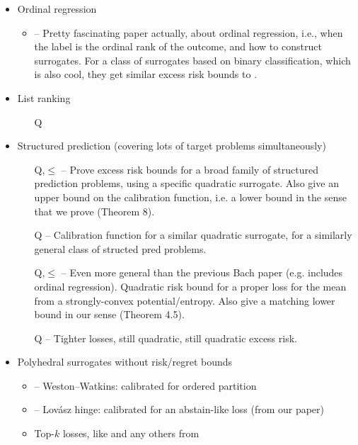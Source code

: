 \documentclass{article}
\theoremstyle{definition}\newtheorem{definition}{Definition}
\theoremstyle{definition}\newtheorem{assumption}{Assumption}
\begin{document}
\begin{itemize}
\item Ordinal regression
  \begin{itemize}
  \item \citet{pedregosa2017consistency} -- Pretty fascinating paper actually, about ordinal regression, i.e., when the label is the ordinal rank of the outcome, and how to construct surrogates.  For a class of surrogates based on binary classification, which is also cool, they get similar excess risk bounds to \citet{bartlett2006convexity}.
  \end{itemize}

\item List ranking
  \begin{itemize}
  \item[Q] \citet[Theorem 10]{ravikumar2011ndcg}
  \end{itemize}
  
\item Structured prediction (covering lots of target problems simultaneously)
  \begin{itemize}
  \item[Q,$\leq$] \citet[Theorem 7]{osokin2017structured} -- Prove excess risk bounds for a broad family of structured prediction problems, using a specific quadratic surrogate.  Also give an upper bound on the calibration function, i.e. a lower bound in the sense that we prove (Theorem 8).
  \item[Q] \citet{ciliberto2016consistent} -- Calibration function for a similar quadratic surrogate, for a similarly general class of structed pred problems.
  \item[Q,$\leq$] \citet[Theorem 4.4]{nowak2019general} -- Even more general than the previous Bach paper \cite{osokin2017structured} (e.g. includes ordinal regression).  Quadratic risk bound for a proper loss for the mean from a strongly-convex potential/entropy.
    Also give a matching lower bound in our sense (Theorem 4.5).
  \item[Q] \citet[Proposition 5]{blondel2019structured} -- Tighter losses, still quadratic, still quadratic excess risk.
  \end{itemize}

\item Polyhedral surrogates without risk/regret bounds
  \begin{itemize}
  \item \citet{wang2020weston} -- Weston--Watkins: calibrated for ordered partition
  \item \citet{yu2018lovasz} -- Lov\'asz hinge: calibrated for an abstain-like loss (from our paper)
  \item Top-$k$ losses, like \citet{lapin2016loss} and any others from \citet{yang2018consistency}
  \end{itemize}
  

\end{itemize}
\end{document}
